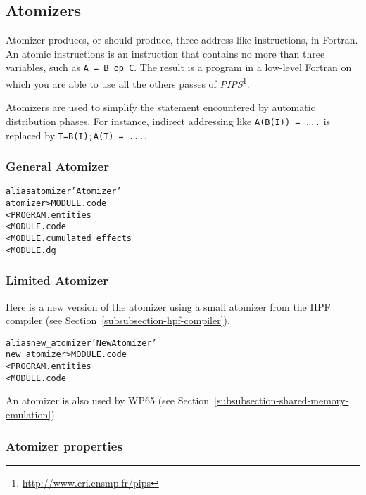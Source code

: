 \documentclass[a4paper]{report}
\newenvironment{PipsMake}{\begin{alltt}}{\end{alltt}}
\newcommand{\LINK}[2]{\href{#2}{#1}\footnote{\url{#2}}\xspace}
\newcommand{\PIPS}{\LINK{\emph{PIPS}}{http://www.cri.ensmp.fr/pips}}
\begin{document}

\subsection{Atomizers}
\label{subsection-atomizers}

Atomizer produces, or should produce, three-address like instructions,
in Fortran. An atomic instructions is an instruction that contains no
more than three variables, such as {\tt A = B op C}. The result is a
program in a low-level Fortran on which you are able to use all the
others passes of \PIPS{}.

Atomizers are used to simplify the statement encountered by automatic
distribution phases. For instance, indirect addressing like
\verb/A(B(I)) = .../ is replaced by \verb/T=B(I);A(T) = .../.

\subsubsection{General Atomizer}

\begin{PipsMake}
alias atomizer 'Atomizer'
atomizer                      > MODULE.code
        < PROGRAM.entities
        < MODULE.code
        < MODULE.cumulated_effects
        < MODULE.dg
\end{PipsMake}

\subsubsection{Limited Atomizer}

Here is a new version of the atomizer using a small atomizer from
the HPF compiler (see Section~\ref{subsubsection-hpf-compiler}).
\begin{PipsMake}
alias new_atomizer 'New Atomizer'
new_atomizer                      > MODULE.code
        < PROGRAM.entities
        < MODULE.code
\end{PipsMake}

An atomizer is also used by WP65 (see
Section~\ref{subsubsection-shared-memory-emulation})


\subsubsection{Atomizer properties}
\end{document}
